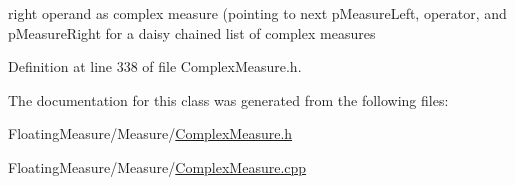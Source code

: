right operand as complex measure (pointing to next p\+Measure\+Left, operator, and p\+Measure\+Right for a daisy chained list of complex measures 



Definition at line 338 of file Complex\+Measure.\+h.



The documentation for this class was generated from the following files\+:\begin{DoxyCompactItemize}
\item 
Floating\+Measure/\+Measure/\hyperlink{ComplexMeasure_8h}{Complex\+Measure.\+h}\item 
Floating\+Measure/\+Measure/\hyperlink{ComplexMeasure_8cpp}{Complex\+Measure.\+cpp}\end{DoxyCompactItemize}
